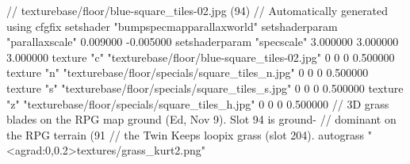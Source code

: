 // texturebase/floor/blue-square_tiles-02.jpg (94)
// Automatically generated using cfgfix
setshader "bumpspecmapparallaxworld"
setshaderparam "parallaxscale" 0.009000 -0.005000
setshaderparam "specscale" 3.000000 3.000000 3.000000
texture "c" "texturebase/floor/blue-square_tiles-02.jpg" 0 0 0 0.500000
texture "n" "texturebase/floor/specials/square_tiles_n.jpg" 0 0 0 0.500000
texture "s" "texturebase/floor/specials/square_tiles_s.jpg" 0 0 0 0.500000
texture "z" "texturebase/floor/specials/square_tiles_h.jpg" 0 0 0 0.500000
// 3D grass blades on the RPG map ground (Ed, Nov 9). Slot 94 is ground-
// dominant on the RPG terrain (91%
// the Twin Keeps loopix grass (slot 204).
autograss "<agrad:0,0.2>textures/grass_kurt2.png"
